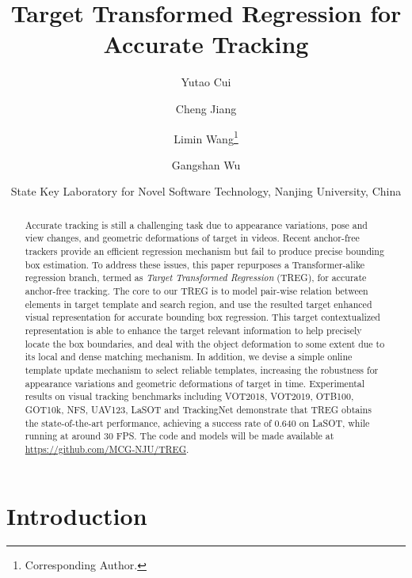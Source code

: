 \documentclass[10pt,twocolumn,letterpaper]{article}
\begin{document}
\title{Target Transformed Regression for Accurate Tracking}



\author{Yutao Cui \and
Cheng Jiang \and
Limin Wang\thanks{Corresponding Author.} \and
Gangshan Wu \and
State Key Laboratory for Novel Software Technology, Nanjing University, China
}





\maketitle
\ificcvfinal\thispagestyle{empty}\fi

\begin{abstract}

Accurate tracking is still a challenging task due to appearance variations, pose and view changes, and geometric deformations of target in videos. Recent anchor-free trackers provide an efficient regression mechanism but fail to produce precise bounding box estimation. To address these issues, this paper repurposes a Transformer-alike regression branch, termed as {\em Target Transformed Regression} (TREG), for accurate anchor-free tracking. The core to our TREG is to model pair-wise relation between elements in target template and search region, and use the resulted target enhanced visual representation for accurate bounding box regression. This target contextualized representation is able to enhance the target relevant information to help precisely locate the box boundaries, and deal with the object deformation to some extent due to its local and dense matching mechanism. In addition, we devise a simple online template update mechanism to select reliable templates, increasing the robustness for appearance variations and geometric deformations of target in time.
Experimental results on visual tracking benchmarks including VOT2018, VOT2019, OTB100, GOT10k, NFS,
UAV123, LaSOT and TrackingNet demonstrate that TREG obtains the state-of-the-art performance, achieving a success rate of 0.640 on LaSOT, while running at around 30 FPS. The code and models will be made available at
\href{https://github.com/MCG-NJU/TREG}{https://github.com/MCG-NJU/TREG}.


\end{abstract}

\section{Introduction}
\end{document}
